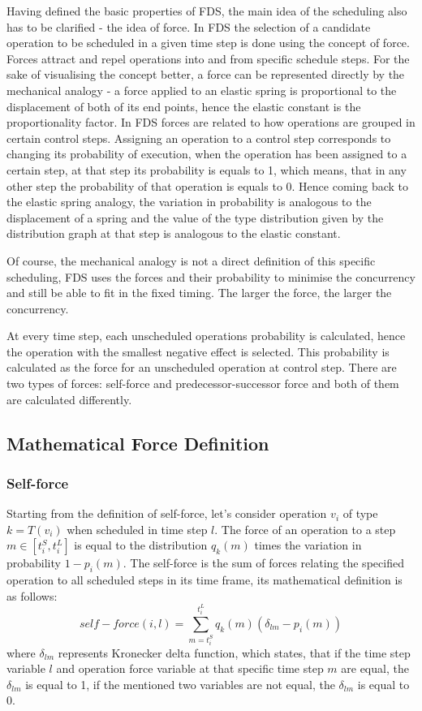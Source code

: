 \documentclass[conference]{IEEEtran}
\begin{document}
Having defined the basic properties of FDS, the main idea of the scheduling also has to be clarified - the idea of force. In FDS the selection of a candidate operation to be scheduled in a given time step is done using the concept of force. Forces attract and repel operations into and from specific schedule steps. For the sake of visualising the concept better, a force can be represented directly by the mechanical analogy - a force applied to an elastic spring is proportional to the displacement of both of its end points, hence the elastic constant is the proportionality factor. In FDS forces are related to how operations are grouped in certain control steps. Assigning an operation to a control step corresponds to changing its probability of execution, when the operation has been assigned to a certain step, at that step its probability is equals to 1, which means, that in any other step the probability of that operation is equals to 0. Hence coming back to the elastic spring analogy, the variation in probability is analogous to the displacement of a spring and the value of the type distribution given by the distribution graph at that step is analogous to the elastic constant.

Of course, the mechanical analogy is not a direct definition of this specific scheduling, FDS uses the forces and their probability to minimise the concurrency and still be able to fit in the fixed timing. The larger the force, the larger the concurrency. 

At every time step, each unscheduled operations probability is calculated, hence the operation with the smallest negative effect is selected. This probability is calculated as the force for an unscheduled operation at control step. There are two types of forces: self-force and predecessor-successor force and both of them are calculated differently.

\subsection{Mathematical Force Definition}
\subsubsection{Self-force}

Starting from the definition of self-force, let's consider operation $v_i$ of type $k = T(v_i)$ when scheduled in time step $l$. The force of an operation to a step $m \in [t_i^S, t_i^L]$ is equal to the distribution $q_k(m)$ times the variation in probability $1 - p_i(m)$. The self-force is the sum of forces relating the specified operation to all scheduled steps in its time frame, its mathematical definition is as follows:
\begin{equation*}
\displaystyle self-force(i, l) = \sum_{m=t_i^S}^{t_i^L} q_k(m) (\delta_{lm} - p_i(m))
\end{equation*}
where $\delta_{lm}$ represents Kronecker delta function, which states, that if the time step variable $l$ and operation force variable at that specific time step $m$ are equal, the $\delta_{lm}$ is equal to 1, if the mentioned two variables are not equal, the $\delta_{lm}$ is equal to 0.
\end{document}

